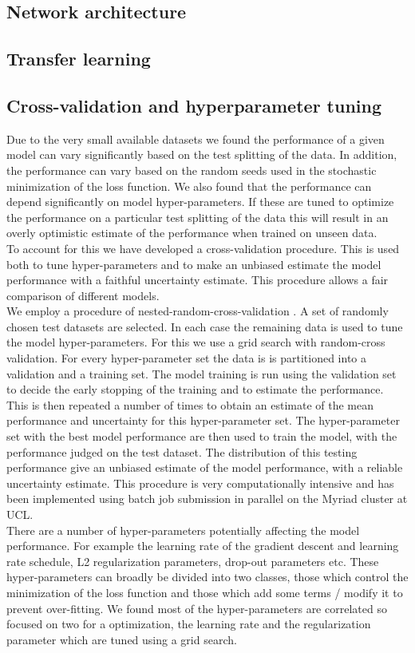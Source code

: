 \documentclass[NOTE, disdraft=true, UKenglish]{\DISCDTLATEXPATH UCLCDTDISdoc}
\begin{document}
\subsection{Network architecture}
\subsection{Transfer learning}
\subsection{Cross-validation and hyperparameter tuning}
Due to the very small available datasets we found the performance of a given model can vary significantly based on the test splitting of the data. In addition, the performance can vary based on the random seeds used in the stochastic minimization of the loss function. We also found that the performance can depend significantly on model hyper-parameters. If these are tuned to optimize the performance on a particular test splitting of the data this will result in an overly optimistic estimate of the performance when trained on unseen data.
\\ \indent To account for this we have developed a cross-validation procedure. This is used both to tune hyper-parameters and to make an unbiased estimate the model performance with a faithful uncertainty estimate. This procedure allows a fair comparison of different models.
\\ \indent We employ a procedure of nested-random-cross-validation \cite{}. A set of randomly chosen test datasets  are selected. In each case the remaining data is used to tune the model hyper-parameters. For this we use a grid search with random-cross validation. For every hyper-parameter set the data is is partitioned into a validation and a training set. The model training is run using the validation set to decide the early stopping of the training and to estimate the performance. This is then repeated a number of times to obtain an estimate of the mean performance and uncertainty for this hyper-parameter set. The hyper-parameter set with the best model performance are then used to train the model, with the performance judged on the test dataset. The distribution of this testing performance give an unbiased estimate of the model performance, with a reliable uncertainty estimate. This procedure is very computationally intensive and has been implemented using batch job submission in parallel on the Myriad cluster at UCL.
\\ \indent There are a number of hyper-parameters potentially affecting the model performance. For example the learning rate of the gradient descent and learning rate schedule, L2 regularization parameters, drop-out parameters etc. These hyper-parameters can broadly be divided into two classes, those which control the minimization of the loss function and those which add some terms / modify it to prevent over-fitting. We found most of the hyper-parameters are correlated so focused on two for a optimization, the learning rate and the regularization parameter which are tuned using a grid search.
%
\end{document}
